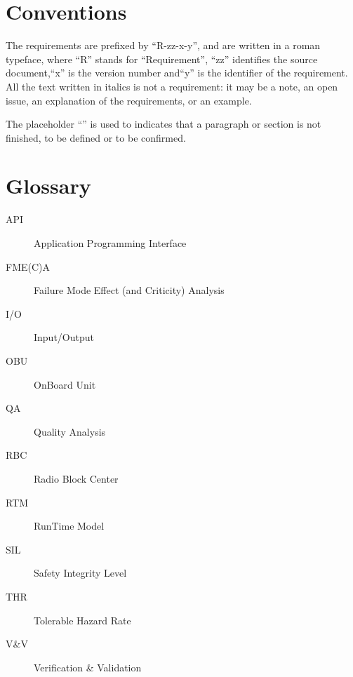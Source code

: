 \section{Conventions}
The requirements are prefixed by “R-zz-x-y”, and are written in a roman typeface, where ``R'' 
stands for ``Requirement'', ``zz'' identifies the source document,``x'' 
is the version number and``y'' is the identifier of the requirement. All the text 
written in italics is not a requirement: it may be a note, an open issue, an 
explanation of the requirements, or an example.

The placeholder “” is used to indicates that a paragraph or section is not finished, 
to be defined or to be confirmed.

\section{Glossary}
\begin{description}
\item[API] Application Programming Interface
\item[FME(C)A] Failure Mode Effect (and Criticity) Analysis
\item[I/O] Input/Output
\item[OBU] OnBoard Unit
\item[QA] Quality Analysis
\item[RBC] Radio Block Center
\item[RTM] RunTime Model
\item[SIL] Safety Integrity Level
\item[THR] Tolerable Hazard Rate
\item[V\&V] Verification \& Validation
\end{description}


